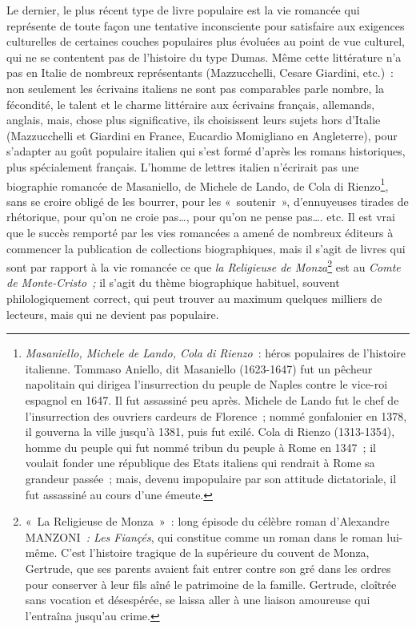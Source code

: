 \documentclass[french,twoside]{book} %
\begin{document}
Le dernier, le plus récent type de livre populaire est la vie romancée qui représente de toute façon une tentative inconsciente pour satisfaire aux exigences culturelles de certaines couches populaires plus évoluées au point de vue culturel, qui ne se contentent pas de l’histoire du type Dumas. Même cette littérature n’a pas en Italie de nombreux représentants (Mazzucchelli, Cesare Giardini, etc.) : non seulement les écrivains italiens ne sont pas comparables parle nombre, la fécondité, le talent et le charme littéraire aux écrivains français, allemands, anglais, mais, chose plus significative, ils choisissent leurs sujets hors d’Italie (Mazzucchelli et Giardini en France, Eucardio Momigliano en Angleterre), pour s’adapter au goût populaire italien qui s’est formé d’après les romans historiques, plus spécialement français. L'homme de lettres italien n’écrirait pas une biographie romancée de Masaniello, de Michele de Lando, de Cola di Rienzo\footnote{\emph{Masaniello, Michele de Lando, Cola di Rienzo} : héros populaires de l’histoire italienne. Tommaso Aniello, dit Masaniello (1623-1647) fut un pêcheur napolitain qui dirigea l’insurrection du peuple de Naples contre le vice-roi espagnol en 1647. Il fut assassiné peu après. Michele de Lando fut le chef de l’insurrection des ouvriers cardeurs de Florence ; nommé gonfalonier en 1378, il gouverna la ville jusqu’à 1381, puis fut exilé. Cola di Rienzo (1313-1354), homme du peuple qui fut nommé tribun du peuple à Rome en 1347 ; il voulait fonder une république des Etats italiens qui rendrait à Rome sa grandeur passée ; mais, devenu impopulaire par son attitude dictatoriale, il fut assassiné au cours d’une émeute.}, sans se croire obligé de les bourrer, pour les « soutenir », d’ennuyeuses tirades de rhétorique, pour qu’on ne croie pas…, pour qu’on ne pense pas…. etc. Il est vrai que le succès remporté par les vies romancées a amené de nombreux éditeurs à commencer la publication de collections biographiques, mais il s’agit de livres qui sont par rapport à la vie romancée ce que \emph{la Religieuse de Monza}\footnote{« La Religieuse de Monza » : long épisode du célèbre roman d’Alexandre MANZONI\emph{ : Les Fiançés}, qui constitue comme un roman dans le roman lui-même. C'est l’histoire tragique de la supérieure du couvent de Monza, Gertrude, que ses parents avaient fait entrer contre son gré dans les ordres pour conserver à leur fils aîné le patrimoine de la famille. Gertrude, cloîtrée sans vocation et désespérée, se laissa aller à une liaison amoureuse qui l’entraîna jusqu’au crime.} est au \emph{Comte de Monte-Cristo ;} il s’agit du thème biographique habituel, souvent philologiquement correct, qui peut trouver au maximum quelques milliers de lecteurs, mais qui ne devient pas populaire.\par
\end{document}

